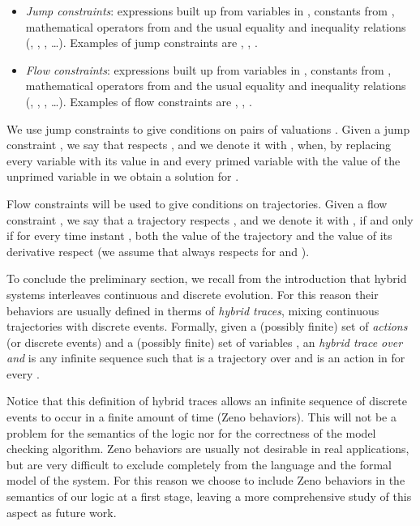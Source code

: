 \documentclass[submission,copyright,creativecommons]{eptcs}
\begin{document}
\begin{itemize}


	\item \emph{Jump constraints}: expressions built up from variables in , constants from , mathematical operators from  and the usual equality and inequality relations (, , , \dots). Examples of jump constraints are , , .

	\item \emph{Flow constraints}: expressions built up from variables in , constants from , mathematical operators from  and the usual equality and inequality relations (, , , \dots). Examples of flow constraints are , , .
\end{itemize}





We use jump constraints to give conditions on pairs of valuations . Given a jump constraint , we say that  respects , and we denote it with , when, by replacing every variable  with its value in  and every primed variable  with the value of the unprimed variable in  we obtain a solution for .

Flow constraints will be used to give conditions on trajectories. Given a flow constraint , we say that a trajectory  respects , and we denote it with , if and only if for every time instant , both the value of the trajectory  and the value of its derivative  respect  (we assume that  always respects  for  and ).

\medskip

To conclude the preliminary section, we recall from the introduction that hybrid systems interleaves continuous and discrete evolution. For this reason their behaviors are usually defined in therms of \emph{hybrid traces}, mixing continuous trajectories with discrete events. Formally, given a (possibly finite) set of \emph{actions} (or discrete events)  and a (possibly finite) set of variables , an \emph{hybrid trace over  and } is any infinite sequence  such that  is a trajectory over  and  is an action in  for every . 


Notice that this definition of hybrid traces allows an infinite sequence of discrete events to occur in a finite amount of time (Zeno behaviors). This will not be a problem for the semantics of the logic nor for the correctness of the model checking algorithm. Zeno behaviors are usually not desirable in real applications, but are very difficult to exclude completely from the language and the formal model of the system. For this reason we choose to include Zeno behaviors in the semantics of our logic at a first stage, leaving a more comprehensive study of this aspect as future work.
\end{document}
